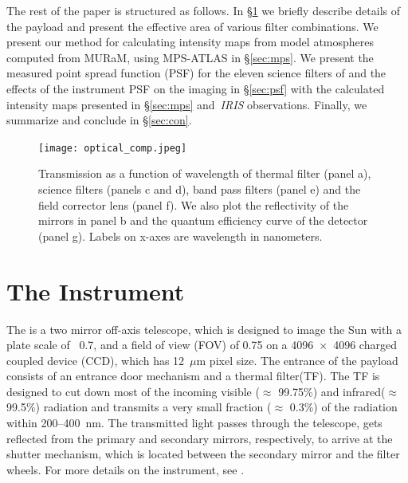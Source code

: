 The rest of the paper is structured as follows. In \S\ref{sec:inst} we briefly describe details of the payload and present the effective area of various filter combinations. We present our method for calculating intensity maps from model atmospheres computed from MURaM, using MPS-ATLAS in \S\ref{sec:mps}. We present the measured point spread function (PSF) for the eleven science filters of {\suit} and the effects of the instrument PSF on the imaging in \S\ref{sec:psf} with the calculated intensity maps presented in \S\ref{sec:mps} and~{\it IRIS} observations. Finally, we summarize and conclude in \S\ref{sec:con}.

\begin{figure}
    \centering
    \texttt{[image: optical\_comp.jpeg]}
    \caption{Transmission as a function of wavelength of thermal filter (panel a), science filters (panels c and d), band pass filters (panel e) and the field corrector lens (panel f). We also plot the reflectivity of the mirrors in panel b and the quantum efficiency curve of the detector (panel g). Labels on x-axes are wavelength in nanometers.} 
    \label{fig:tras_prof}
\end{figure}


\section{The Instrument} \label{sec:inst}
The {\suit} is a two mirror off-axis telescope, which is designed to image the Sun with a plate scale of ~0.7{\arcsec}, and a field of view (FOV) of 0.75{\degree} on a 4096~$\times$~4096 charged coupled device (CCD), which has 12~$\mu$m pixel size. %
The entrance of the payload consists of an entrance door mechanism and a thermal filter(TF). The TF \cite[][]{thermal_filter_1, thermal_filter_2} is designed to cut down most of the incoming visible ($\approx$ 99.75\%) and infrared($\approx$ 99.5\%) radiation and transmits a very small fraction ($\approx$ 0.3\%) of the radiation within 200{--}400~nm. The transmitted light passes through the telescope, gets reflected from the primary and secondary mirrors, respectively, to arrive at the shutter mechanism, which is located between the secondary mirror and the filter wheels. For more details on the instrument, see \cite{article,suit_main}.

